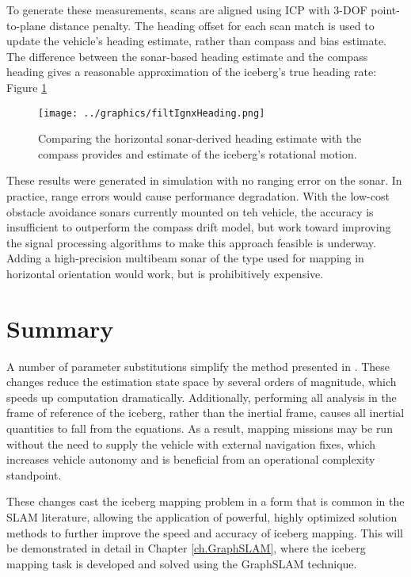 To generate these measurements, scans are aligned using ICP with 3-DOF point-to-plane distance penalty. The heading offset for each scan match is used to update the vehicle's heading estimate, rather than compass and bias estimate. The difference between the sonar-based heading estimate and the compass heading gives a reasonable approximation of the iceberg's true heading rate: Figure \ref{fig:filtIgnx}


\begin{figure}[h]
   \centering
   \texttt{[image: ../graphics/filtIgnxHeading.png]} %
   \caption{Comparing the horizontal sonar-derived heading estimate with the compass provides and estimate of the iceberg's rotational motion.}
   \label{fig:filtIgnx}
\end{figure}

These results were generated in simulation with no ranging error on the sonar. In practice, range errors would cause performance degradation. With the low-cost obstacle avoidance sonars currently mounted on teh vehicle, the accuracy is insufficient to outperform the compass drift model, but work toward improving the signal processing algorithms to make this approach feasible is underway. Adding a high-precision multibeam sonar of the type used for mapping in horizontal orientation would work, but is prohibitively expensive.

\section{Summary}

A number of parameter substitutions simplify the method presented in \cite{Kimball2011}. These changes reduce the estimation state space by several orders of magnitude, which speeds up computation dramatically. Additionally, performing all analysis in the frame of reference of the iceberg, rather than the inertial frame, causes all inertial quantities to fall from the equations. As a result, mapping missions may be run without the need to supply the vehicle with external navigation fixes, which increases vehicle autonomy and is beneficial from an operational complexity standpoint. 

These changes cast the iceberg mapping problem in a form that is common in the SLAM literature, allowing the application of powerful, highly optimized solution methods to further improve the speed and accuracy of iceberg mapping. This will be demonstrated in detail in Chapter \ref{ch.GraphSLAM}, where the iceberg mapping task is developed and solved using the GraphSLAM technique. 

